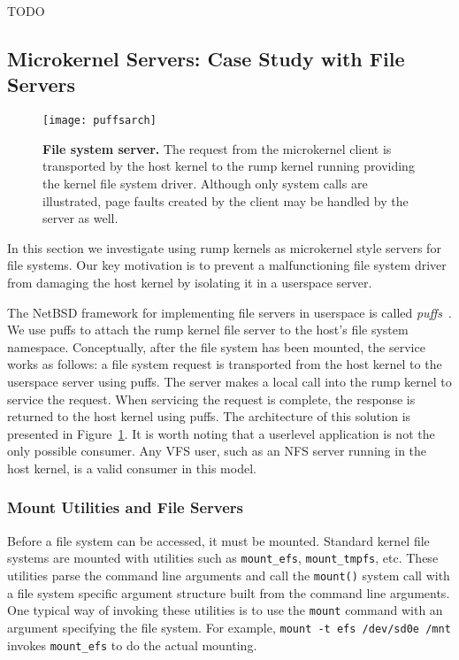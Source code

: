 TODO


\clearpage
\subsection{Microkernel Servers: Case Study with File Servers}
\label{sect:libp2k}

\begin{figure}[t]
\texttt{[image: puffsarch]}
\caption[File system server]{
\textbf{File system server.}
The request from the microkernel client is transported by the host kernel
to the rump kernel running providing the kernel file system driver.
Although only system calls are illustrated, page faults created by
the client may be handled by the server as well.
}
\label{fig:fsserv}
\end{figure}

In this section we investigate using rump kernels as microkernel
style servers for file systems.  Our key motivation is to
prevent a malfunctioning file system driver from damaging the host
kernel by isolating it in a userspace server.

The NetBSD framework for implementing file servers in userspace is
called \textit{puffs}~\cite{kantee:puffs}.  We use puffs to attach
the rump kernel file server to the host's file system namespace.  Conceptually,
after the file system has been mounted, the service works as
follows: a file system request is transported from the host kernel
to the userspace server using puffs.  The server makes a local call
into the rump kernel to
service the request.  When servicing the request is complete, the response is returned
to the host kernel using puffs.  The architecture of this solution
is presented in Figure~\ref{fig:fsserv}.  It is worth noting that
a userlevel application is not the only possible
consumer.  Any VFS user, such as an NFS server running in the host kernel,
is a valid consumer in this model.


\subsubsection{Mount Utilities and File Servers}

Before a file system can be accessed, it must be mounted.  Standard
kernel file systems are mounted with utilities such as \verb+mount_efs+,
\verb+mount_tmpfs+, etc.  These utilities parse the command line
arguments and call the \texttt{mount()} system call with a file system
specific argument structure built from the command line arguments.  One typical
way of invoking these utilities is to use the \texttt{mount} command
with an argument specifying the file system.  For example,
\verb+mount -t efs /dev/sd0e /mnt+ invokes \verb+mount_efs+ to do
the actual mounting.

